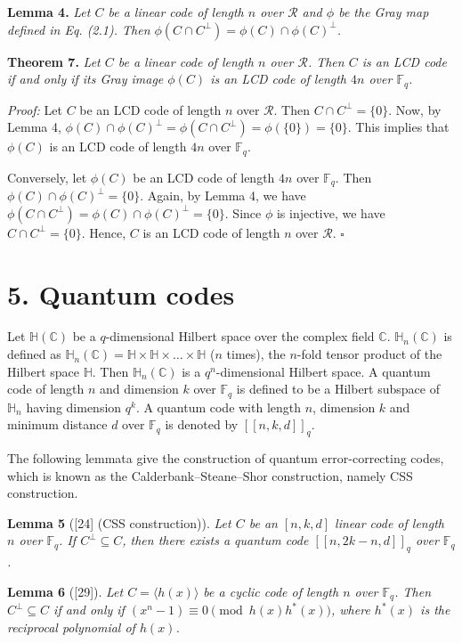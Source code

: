 \documentclass[12pt]{article}
\begin{document}
\textbf{Lemma 4.} \textit{Let $C$ be a linear code of length $n$ over $\mathcal{R}$ and $\phi$ be the Gray map defined in Eq. (2.1). Then $\phi(C \cap C^{\perp}) = \phi(C) \cap \phi(C)^{\perp}$.}

\textbf{Theorem 7.} \textit{Let $C$ be a linear code of length $n$ over $\mathcal{R}$. Then $C$ is an LCD code if and only if its Gray image $\phi(C)$ is an LCD code of length $4n$ over $\mathbb{F}_q$.}

\textit{Proof:} Let $C$ be an LCD code of length $n$ over $\mathcal{R}$. Then $C \cap C^{\perp} = \{0\}$. Now, by Lemma 4, $\phi(C) \cap \phi(C)^{\perp} = \phi(C \cap C^{\perp}) = \phi(\{0\}) = \{0\}$. This implies that $\phi(C)$ is an LCD code of length $4n$ over $\mathbb{F}_q$.

Conversely, let $\phi(C)$ be an LCD code of length $4n$ over $\mathbb{F}_q$. Then $\phi(C) \cap \phi(C)^{\perp} = \{0\}$. Again, by Lemma 4, we have $\phi(C \cap C^{\perp}) = \phi(C) \cap \phi(C)^{\perp} = \{0\}$. Since $\phi$ is injective, we have $C \cap C^{\perp} = \{0\}$. Hence, $C$ is an LCD code of length $n$ over $\mathcal{R}$. $\square$

\section*{5. Quantum codes}

Let $\mathbb{H}(\mathbb{C})$ be a $q$-dimensional Hilbert space over the complex field $\mathbb{C}$. $\mathbb{H}_n(\mathbb{C})$ is defined as $\mathbb{H}_n(\mathbb{C}) = \mathbb{H} \times \mathbb{H} \times \dots \times \mathbb{H}$ ($n$ times), the $n$-fold tensor product of the Hilbert space $\mathbb{H}$. Then $\mathbb{H}_n(\mathbb{C})$ is a $q^n$-dimensional Hilbert space. A quantum code of length $n$ and dimension $k$ over $\mathbb{F}_q$ is defined to be a Hilbert subspace of $\mathbb{H}_n$ having dimension $q^k$. A quantum code with length $n$, dimension $k$ and minimum distance $d$ over $\mathbb{F}_q$ is denoted by $[[n, k, d]]_q$.

The following lemmata give the construction of quantum error-correcting codes, which is known as the Calderbank--Steane--Shor construction, namely CSS construction.

\textbf{Lemma 5} ([24] (CSS construction)). \textit{Let $C$ be an $[n, k, d]$ linear code of length $n$ over $\mathbb{F}_q$. If $C^{\perp} \subseteq C$, then there exists a quantum code $[[n, 2k - n, d]]_q$ over $\mathbb{F}_q$.}

\textbf{Lemma 6} ([29]). \textit{Let $C = \langle h(x) \rangle$ be a cyclic code of length $n$ over $\mathbb{F}_q$. Then $C^{\perp} \subseteq C$ if and only if $(x^n - 1) \equiv 0 \pmod{h(x) h^*(x)}$, where $h^*(x)$ is the reciprocal polynomial of $h(x)$.}
\end{document}
